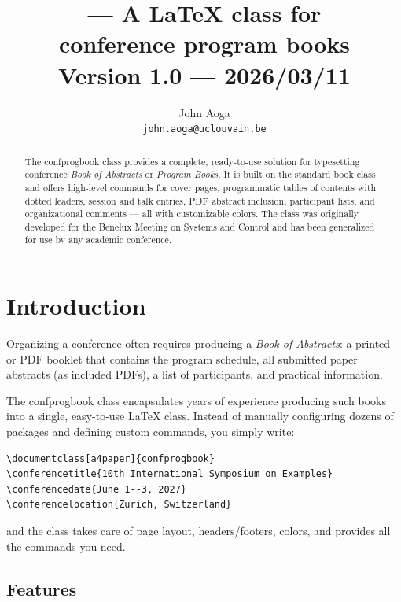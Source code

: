 \documentclass[a4paper,11pt]{article}
\title{%
  \cls{confprogbook} --- A \LaTeX{} class for\\
  conference program books\\[1ex]
  \large Version 1.0 --- 2026/03/11%
}
\author{John Aoga\\\texttt{john.aoga@uclouvain.be}}
\date{}
\newcommand{\cls}[1]{\textsf{#1}}
\begin{document}
\maketitle

\begin{abstract}
\noindent
The \cls{confprogbook} class provides a complete, ready-to-use solution for typesetting
conference \emph{Book of Abstracts} or \emph{Program Books}. It is built on the standard
\cls{book} class and offers high-level commands for cover pages, programmatic tables of
contents with dotted leaders, session and talk entries, PDF abstract inclusion,
participant lists, and organizational comments --- all with customizable colors.
The class was originally developed for the Benelux Meeting on Systems and Control
and has been generalized for use by any academic conference.
\end{abstract}

\tableofcontents
\clearpage

\section{Introduction}
\label{sec:intro}

Organizing a conference often requires producing a \emph{Book of Abstracts}: a printed
or PDF booklet that contains the program schedule, all submitted paper abstracts
(as included PDFs), a list of participants, and practical information.

The \cls{confprogbook} class encapsulates years of experience producing such books
into a single, easy-to-use \LaTeX{} class. Instead of manually configuring dozens
of packages and defining custom commands, you simply write:

\begin{lstlisting}
\documentclass[a4paper]{confprogbook}
\conferencetitle{10th International Symposium on Examples}
\conferencedate{June 1--3, 2027}
\conferencelocation{Zurich, Switzerland}
\end{lstlisting}

\noindent and the class takes care of page layout, headers/footers, colors,
and provides all the commands you need.

\subsection{Features}
\end{document}
